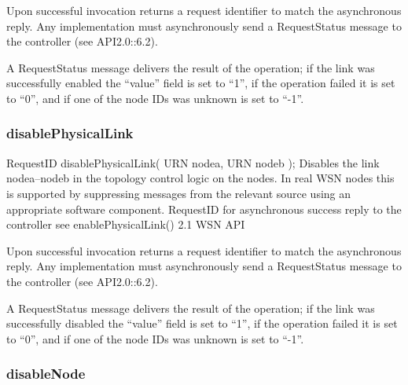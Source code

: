 Upon successful invocation returns a request identifier to match the asynchronous reply. Any implementation must asynchronously send a RequestStatus message to the controller (see API2.0::6.2).

A RequestStatus message delivers the result of the operation; if the link was successfully enabled the ``value'' field is set to ``1'', if the operation failed it is set to ``0'', and if one of the node IDs was unknown is set to ``-1''.

			\subsubsection{disablePhysicalLink}

\begin{apidoc}
	{RequestID disablePhysicalLink( URN nodea, URN nodeb );} %
	{Disables the link nodea--nodeb in the topology control logic on the nodes. In real WSN nodes this is supported by suppressing messages from the relevant source using an appropriate software component.} %
	{
	} %
	{RequestID for asynchronous success reply to the controller} %
	{see enablePhysicalLink()} %
	{2.1 WSN API} %
\end{apidoc}

Upon successful invocation returns a request identifier to match the asynchronous reply. Any implementation must asynchronously send a RequestStatus message to the controller (see API2.0::6.2).

A RequestStatus message delivers the result of the operation; if the link was successfully disabled the ``value'' field is set to ``1'', if the operation failed it is set to ``0'', and if one of the node IDs was unknown is set to ``-1''.

			\subsubsection{disableNode}



